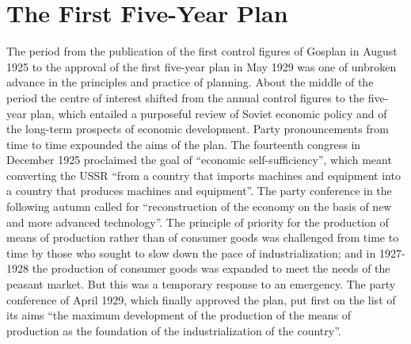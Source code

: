 \chapter{The First Five-Year Plan}

The period from the publication of the first control figures of Gosplan in August 1925 to the approval of the first five-year plan in May 1929 was one of unbroken advance in the principles and practice of planning. About the middle of the period the centre of interest shifted from the annual control figures to the five-year plan, which entailed a purposeful review of Soviet economic policy and of the long-term prospects of economic development. Party pronouncements from time to time expounded the aims of the plan. The fourteenth congress in December 1925 proclaimed the goal of ``economic self-sufficiency'', which meant converting the USSR ``from a country that imports machines and equipment into a country that produces machines and equipment''. The party conference in the following autumn called for ``reconstruction of the economy on the basis of new and more advanced technology''. The principle of priority for the production of means of production rather than of consumer goods was challenged from time to time by those who sought to slow down the pace of industrialization; and in 1927-1928 the production of consumer goods was expanded to meet the needs of the peasant market. But this was a temporary response to an emergency. The party conference of April 1929, which finally approved the plan, put first on the list of its aims ``the maximum development of the production of the means of production as the foundation of the industrialization of the country''. 

